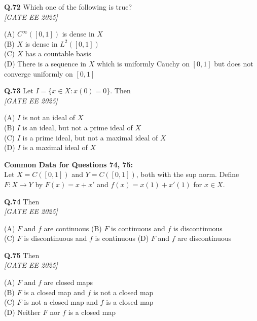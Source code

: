 \documentclass[11pt]{article}
\begin{document}
\begin{flushleft}
\textbf{Q.72} Which one of the following is true? 
\\[1ex] \textit{[GATE EE 2025]}


(A) $C^\infty([0,1])$ is dense in $X$ \\
(B) $X$ is dense in $L^2([0,1])$ \\
(C) $X$ has a countable basis \\
(D) There is a sequence in $X$ which is uniformly Cauchy on $[0,1]$ but does not converge uniformly on $[0,1]$
\end{flushleft}

\begin{flushleft}
\textbf{Q.73} Let $I = \{ x \in X : x(0) = 0 \}$. Then 
\\[1ex] \textit{[GATE EE 2025]}


(A) $I$ is not an ideal of $X$ \\
(B) $I$ is an ideal, but not a prime ideal of $X$ \\
(C) $I$ is a prime ideal, but not a maximal ideal of $X$ \\
(D) $I$ is a maximal ideal of $X$
\end{flushleft}

\begin{flushleft}
\textbf{Common Data for Questions 74, 75:} \\
Let $X = C([0,1])$ and $Y = C([0,1])$, both with the sup norm. Define $F: X \to Y$ by $F(x) = x + x'$
and $f(x) = x(1) + x'(1)$ for $x \in X$.
\end{flushleft}

\begin{flushleft}
\textbf{Q.74} Then
\\[1ex] \textit{[GATE EE 2025]}

(A) $F$ and $f$ are continuous \hspace{2em}
(B) $F$ is continuous and $f$ is discontinuous \\
(C) $F$ is discontinuous and $f$ is continuous \hspace{2em}
(D) $F$ and $f$ are discontinuous
\end{flushleft}

\begin{flushleft}
\textbf{Q.75} Then
\\[1ex] \textit{[GATE EE 2025]}

(A) $F$ and $f$ are closed maps \\
(B) $F$ is a closed map and $f$ is not a closed map \\
(C) $F$ is not a closed map and $f$ is a closed map \\
(D) Neither $F$ nor $f$ is a closed map
\end{flushleft}
\end{document}
